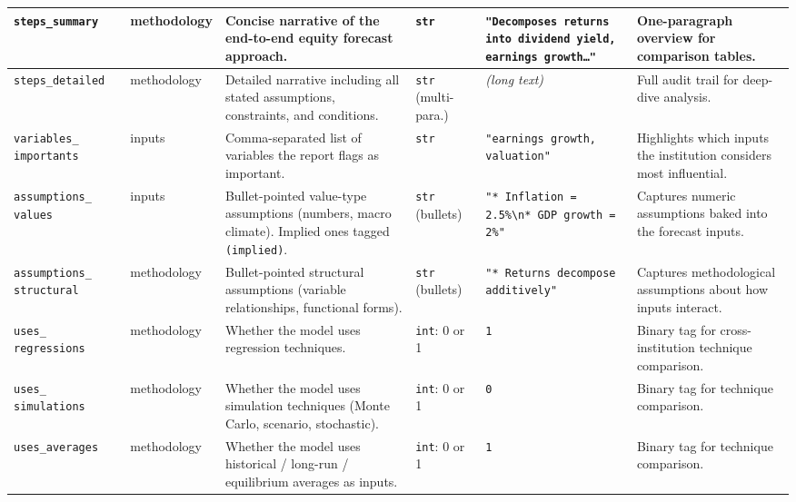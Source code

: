 \documentclass[11pt,a4paper]{article}
\begin{document}
\begin{longtable}{@{} L{2.8cm} L{2.2cm} L{3.2cm} L{2.2cm} L{2.5cm} L{3cm} @{}}
\texttt{steps\_summary}
  & methodology
  & Concise narrative of the end-to-end equity forecast approach.
  & \texttt{str}
  & \texttt{"Decomposes returns into dividend yield, earnings growth\ldots"}
  & One-paragraph overview for comparison tables. \\
\midrule

\texttt{steps\_detailed}
  & methodology
  & Detailed narrative including all stated assumptions, constraints, and conditions.
  & \texttt{str} (multi-para.)
  & \emph{(long text)}
  & Full audit trail for deep-dive analysis. \\
\midrule

\texttt{variables\_ importants}
  & inputs
  & Comma-separated list of variables the report flags as important.
  & \texttt{str}
  & \texttt{"earnings growth, valuation"}
  & Highlights which inputs the institution considers most influential. \\
\midrule

\texttt{assumptions\_ values}
  & inputs
  & Bullet-pointed value-type assumptions (numbers, macro climate). Implied ones tagged \texttt{(implied)}.
  & \texttt{str} (bullets)
  & \texttt{"* Inflation = 2.5\%\textbackslash n* GDP growth = 2\%"}
  & Captures numeric assumptions baked into the forecast inputs. \\
\midrule

\texttt{assumptions\_ structural}
  & methodology
  & Bullet-pointed structural assumptions (variable relationships, functional forms).
  & \texttt{str} (bullets)
  & \texttt{"* Returns decompose additively"}
  & Captures methodological assumptions about how inputs interact. \\
\midrule

\texttt{uses\_ regressions}
  & methodology
  & Whether the model uses regression techniques.
  & \texttt{int}: 0 or 1
  & \texttt{1}
  & Binary tag for cross-institution technique comparison. \\
\midrule

\texttt{uses\_ simulations}
  & methodology
  & Whether the model uses simulation techniques (Monte Carlo, scenario, stochastic).
  & \texttt{int}: 0 or 1
  & \texttt{0}
  & Binary tag for technique comparison. \\
\midrule

\texttt{uses\_averages}
  & methodology
  & Whether the model uses historical / long-run / equilibrium averages as inputs.
  & \texttt{int}: 0 or 1
  & \texttt{1}
  & Binary tag for technique comparison. \\
\midrule


\end{longtable}
\end{document}
